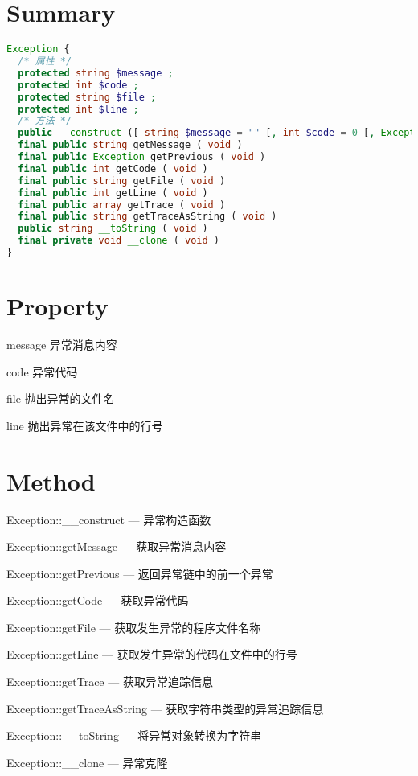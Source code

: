\section{Summary}


\begin{lstlisting}[language=PHP]
Exception {
  /* 属性 */
  protected string $message ;
  protected int $code ;
  protected string $file ;
  protected int $line ;
  /* 方法 */
  public __construct ([ string $message = "" [, int $code = 0 [, Exception $previous = NULL ]]] )
  final public string getMessage ( void )
  final public Exception getPrevious ( void )
  final public int getCode ( void )
  final public string getFile ( void )
  final public int getLine ( void )
  final public array getTrace ( void )
  final public string getTraceAsString ( void )
  public string __toString ( void )
  final private void __clone ( void )
}
\end{lstlisting}


\section{Property}


\begin{compactitem}
\item message 异常消息内容
\item code 异常代码
\item file 抛出异常的文件名
\item line 抛出异常在该文件中的行号
\end{compactitem}


\section{Method}


\begin{compactitem}
\item Exception::\_\_construct — 异常构造函数
\item Exception::getMessage — 获取异常消息内容
\item Exception::getPrevious — 返回异常链中的前一个异常
\item Exception::getCode — 获取异常代码
\item Exception::getFile — 获取发生异常的程序文件名称
\item Exception::getLine — 获取发生异常的代码在文件中的行号
\item Exception::getTrace — 获取异常追踪信息
\item Exception::getTraceAsString — 获取字符串类型的异常追踪信息
\item Exception::\_\_toString — 将异常对象转换为字符串
\item Exception::\_\_clone — 异常克隆
\end{compactitem}

